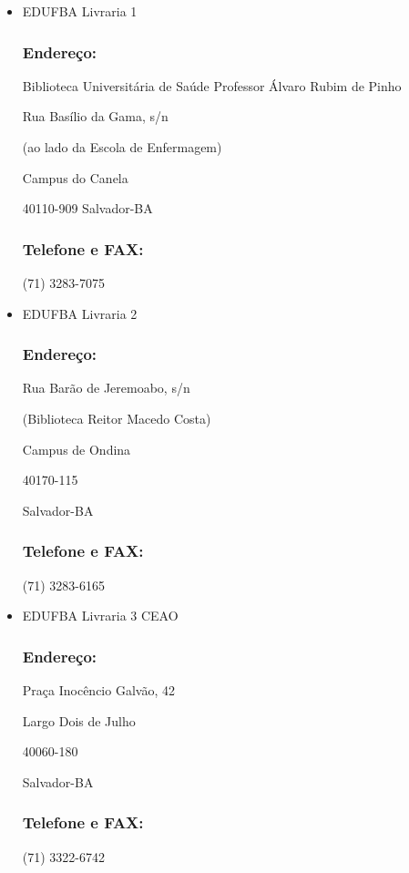         
    \begin{itemize}
        \item EDUFBA Livraria 1    
            \subsubsection{Endereço:} 
            Biblioteca Universitária de Saúde Professor Álvaro Rubim de Pinho
            
            Rua Basílio da Gama, s/n
            
            (ao lado da Escola de Enfermagem)
            
            Campus do Canela
            
            40110-909 Salvador-BA
            \subsubsection{Telefone e FAX:}
             (71) 3283-7075 \\
             
        \item EDUFBA Livraria 2
        
           \subsubsection{Endereço:}
           Rua Barão de Jeremoabo, s/n
            
            (Biblioteca Reitor Macedo Costa)

            Campus de Ondina

            40170-115 
            
            Salvador-BA
            
            \subsubsection{Telefone e FAX:}
            (71) 3283-6165 \\
            
        \item EDUFBA Livraria 3 CEAO
        
            \subsubsection{Endereço:}
            Praça Inocêncio Galvão, 42

            Largo Dois de Julho

            40060-180 
            
            Salvador-BA
            
            \subsubsection{Telefone e FAX:}
            (71) 3322-6742
            
        \end{itemize}
        
